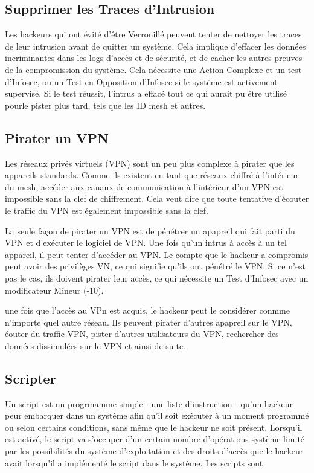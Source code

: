 \subsection{Supprimer les Traces d'Intrusion} 

Les hackeurs qui ont évité d'être Verrouillé peuvent tenter de nettoyer les traces de leur intrusion avant de quitter un système. Cela implique d'effacer les données incriminantes dans les logs d'accès et de sécurité, et de cacher les autres preuves de la compromission du système. Cela nécessite une Action Complexe et un test d'Infosec, ou un Test en Opposition d'Infosec si le système est activement supervisé. Si le test réussit, l'intrus a effacé tout ce qui aurait pu être utilisé pourle pister plus tard, tels que les ID mesh et autres. 

\subsection{Pirater un VPN} 

Les réseaux privés virtuels (VPN) sont un peu plus complexe à pirater que les appareils standards. Comme ils existent en tant que réseaux chiffré à l'intérieur du mesh, accéder aux canaux de communication à l'intérieur d'un VPN est impossible sans la clef de chiffrement. Cela veut dire que toute tentative d'écouter le traffic du VPN est également impossible sans la clef. 

La seule façon de pirater un VPN est de pénétrer un apapreil qui fait parti du VPN et d'exécuter le logiciel de VPN. Une fois qu'un intrus à accès à un tel appareil, il peut tenter d'accéder au VPN. Le compte que le hackeur a compromis peut avoir des privilèges VN, ce qui signifie qu'ils ont pénétré le VPN. Si ce n'est pas le cas, ils doivent pirater leur accès, ce qui nécessite un Test d'Infosec avec un modificateur Mineur (-10). 

une fois que l'accès au VPn est acquis, le hackeur peut le considérer conmme n'importe quel autre réseau. Ils peuvent pirater d'autres apapreil sur le VPN, éouter du traffic VPN, pister d'autres utilisateurs du VPN, rechercher des données dissimulées sur le VPN et ainsi de suite. 

\subsection{Scripter} 

Un script est un progrmamme simple - une liste d'instruction - qu'un hackeur peur embarquer dans un système afin qu'il soit exécuter à un moment programmé ou selon certains conditions, sans même que le hackeur ne soit présent. Lorsqu'il est activé, le script va s'occuper d'un certain nombre d'opérations système limité par les possibilités du système d'exploitation et des droits d'accès que le hackeur avait lorsqu'il a implémenté le script dans le système. Les scripts sont 

